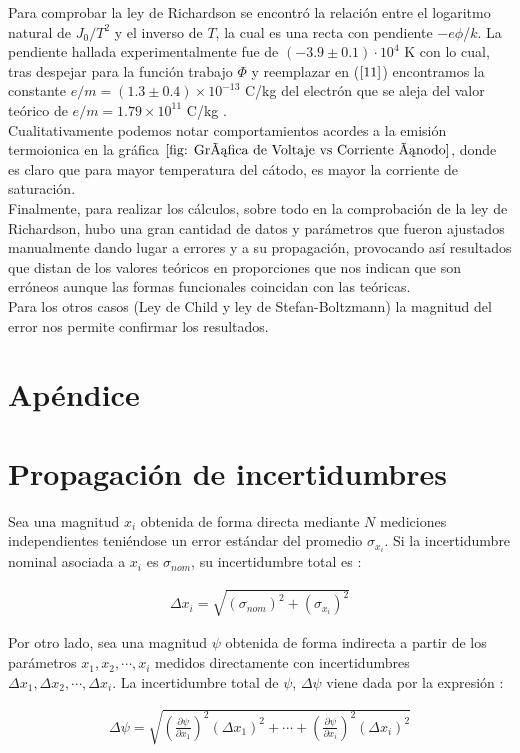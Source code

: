 \documentclass[%
 reprint,
 amsmath,amssymb,
 aps,
]{revtex4-2}
\begin{document}
Para comprobar la ley de Richardson se encontró la relación entre el logaritmo natural de $J_0/T^2$ y el inverso de $T$, la cual es una recta con pendiente $-e\phi$/$k$. La pendiente hallada experimentalmente fue de $(-3.9 \pm 0.1) \cdot 10^4 \text{ K}$ con lo cual, tras despejar para la función trabajo $\Phi$ y reemplazar en ($\ref{11}$) encontramos la constante $e/m = (1.3 \pm 0.4) \times 10^{-13}$ C/kg del electrón que se aleja del valor teórico de $e/m = 1.79 \times 10^{11}$ C/kg \cite{codata}.
\\

Cualitativamente podemos notar comportamientos acordes a la emisión termoionica en la gráfica $\ref{fig: Gráfica de Voltaje vs Corriente ánodo}$, donde es claro que para mayor temperatura del cátodo, es mayor la corriente de saturación.
\\

Finalmente, para realizar los cálculos, sobre todo en la comprobación de la ley de Richardson, hubo una gran cantidad de datos y parámetros que fueron ajustados manualmente dando lugar a errores y a su propagación, provocando así resultados que distan de los valores teóricos en proporciones que nos indican que son erróneos aunque las formas funcionales coincidan con las teóricas.\\

Para los otros casos (Ley de Child y ley de Stefan-Boltzmann) la magnitud del error nos permite confirmar los resultados.



\section{Apéndice}

\appendix
\section{Propagación de incertidumbres}
Sea una magnitud $x_i$ obtenida de forma directa mediante $N$ mediciones independientes teniéndose un error estándar del promedio $\sigma_{x_i}$. Si la incertidumbre nominal asociada a $x_i$ es $\sigma_{nom}$, su incertidumbre total es \cite{ardila}:

\begin{align*}
    \Delta x_i = \sqrt{(\sigma_{nom})^2+ (\sigma_{x_i})^2}
\end{align*}

\vspace{0.2 cm}
Por otro lado, sea una magnitud $\psi$ obtenida de forma indirecta a partir de los parámetros $x_{1}, x_{2}, \dotsb, x_{i}$ medidos directamente con incertidumbres $\Delta x_{1}, \Delta x_{2}, \dotsb, \Delta x_{i}$. La incertidumbre total de $\psi$, $\Delta \psi$ viene dada por la expresión \cite{ardila}:

\begin{align}
    \Delta \psi = \sqrt{\left( \frac{\partial \psi}{\partial x_{1}}\right)^2(\Delta x_{1})^2  + \dotsb + \left( \frac{\partial \psi}{\partial x_{i}}\right)^2(\Delta x_{i})^2}
    \label{Itmbre_Varias_Medidas}
\end{align}


\end{document}

